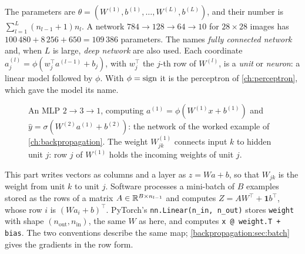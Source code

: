 \begin{notechapter}
The parameters are $\theta = (W^{(1)}, b^{(1)},\dots,W^{(L)}, b^{(L)})$, and their number is
$\sum_{l=1}^L(n_{l-1} + 1)n_l$. A network $784\to128\to64\to10$ for $28\times28$ images has
$100\,480 + 8\,256 + 650 = 109\,386$ parameters. The names \emph{fully connected network} and,
when $L$ is large, \emph{deep network} are also used. Each coordinate $a^{(l)}_j = \phi(w_j^\top a^{(l-1)} + b_j)$,
with $w_j^\top$ the $j$-th row of $W^{(l)}$, is a \emph{unit} or \emph{neuron}: a linear model followed by
$\phi$. With $\phi = \operatorname{sign}$ it is the perceptron of \cref{ch:perceptron}, which gave the model its
name.

\begin{figure}[ht]
\centering
{}
\caption{An MLP $2\to3\to1$, computing $a^{(1)} = \phi(W^{(1)}x + b^{(1)})$ and $\hat y = \sigma(W^{(2)}a^{(1)} + b^{(2)})$: the network of
the worked example of \cref{ch:backpropagation}.
The weight $W^{(1)}_{jk}$ connects input $k$ to hidden unit $j$: row $j$ of $W^{(1)}$ holds the
incoming weights of unit $j$.}
\label{feedforward-networks:fig:mlp}
\end{figure}

\begin{remark}\label{feedforward-networks:rem:rows}
This part writes vectors as columns and a layer as $z = Wa + b$, so that $W_{jk}$ is the weight
from unit $k$ to unit $j$. Software processes a mini-batch of $B$ examples stored as the rows of
a matrix $A\in\mathbb{R}^{B\times n_{l-1}}$ and computes $Z = AW^\top + \mathbf 1b^\top$, whose row $i$ is $(Wa_i + b)^\top$.
PyTorch's \texttt{nn.Linear(n\_in, n\_out)} stores \texttt{weight} with shape
$(n_{\mathrm{out}}, n_{\mathrm{in}})$, the same $W$ as here, and computes
\texttt{x @ weight.T + bias}. The two conventions describe the same map;
\cref{backpropagation:sec:batch} gives the gradients in the row form.
\end{remark}


\end{notechapter}
